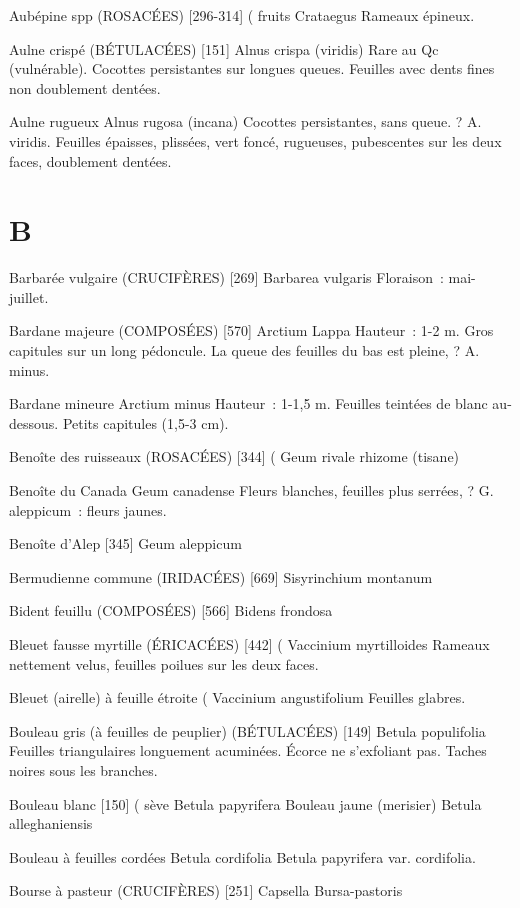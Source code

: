 Aubépine spp (ROSACÉES)  [296-314]				( fruits
				Crataegus
Rameaux épineux.

Aulne crispé (BÉTULACÉES)  [151]
				Alnus crispa (viridis)
Rare au Qc (vulnérable). Cocottes persistantes sur longues queues.
Feuilles avec dents fines non doublement dentées.

Aulne rugueux
				Alnus rugosa (incana)
Cocottes persistantes, sans queue. ? A. viridis.
Feuilles épaisses, plissées, vert foncé, rugueuses, pubescentes sur les deux faces, doublement dentées.
\chapter*{B}

Barbarée vulgaire (CRUCIFÈRES)  [269]
				Barbarea vulgaris
Floraison : mai-juillet.

Bardane majeure (COMPOSÉES)  [570]
				Arctium Lappa
Hauteur : 1-2 m. Gros capitules sur un long pédoncule. La queue des feuilles du bas est pleine, ? A. minus.

Bardane mineure
				Arctium minus
Hauteur : 1-1,5 m. Feuilles teintées de blanc au-dessous. Petits capitules (1,5-3 cm).

Benoîte des ruisseaux (ROSACÉES)  [344]			(
				Geum rivale			rhizome (tisane)

Benoîte du Canada
				Geum canadense
Fleurs blanches, feuilles plus serrées, ? G. aleppicum : fleurs jaunes.


Benoîte d’Alep  [345]
				Geum aleppicum

Bermudienne commune (IRIDACÉES)  [669]
				Sisyrinchium montanum

Bident feuillu (COMPOSÉES)  [566]
				Bidens frondosa

Bleuet fausse myrtille (ÉRICACÉES)  [442]			(
				Vaccinium myrtilloides
Rameaux nettement velus, feuilles poilues sur les deux faces.

Bleuet (airelle) à feuille étroite					(
				Vaccinium angustifolium
Feuilles glabres.

Bouleau gris (à feuilles de peuplier) (BÉTULACÉES) [149]
				Betula populifolia
Feuilles triangulaires longuement acuminées.
Écorce ne s’exfoliant pas.
Taches noires sous les branches.

Bouleau blanc  [150]							( sève
				Betula papyrifera
Bouleau jaune (merisier)
				Betula alleghaniensis

Bouleau à feuilles cordées
				Betula cordifolia
    Betula papyrifera var. cordifolia.

Bourse à pasteur (CRUCIFÈRES)  [251]
				Capsella Bursa-pastoris

